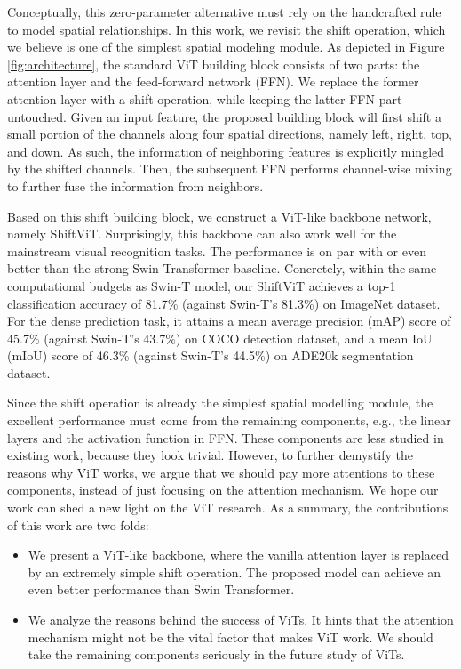 \documentclass[letterpaper]{article} \usepackage{aaai22}  \usepackage{times}  \usepackage{helvet}  \usepackage{courier}  \usepackage[hyphens]{url}  \usepackage{graphicx} \usepackage{amsmath}
\begin{document}
Conceptually, this zero-parameter alternative must rely on the handcrafted rule to model spatial relationships. In this work, we revisit the shift operation, which we believe is one of the simplest spatial modeling module. As depicted in Figure \ref{fig:architecture}, the standard ViT building block consists of two parts: the attention layer and the feed-forward network (FFN). We replace the former attention layer with a shift operation, while keeping the latter FFN part untouched. Given an input feature, the proposed building block will first shift a small portion of the channels along four spatial directions, namely left, right, top, and down. As such, the information of neighboring features is explicitly mingled by the shifted channels. Then, the subsequent FFN performs channel-wise mixing to further fuse the information from neighbors.

Based on this shift building block, we construct a ViT-like backbone network, namely ShiftViT. Surprisingly, this backbone can also work well for the mainstream visual recognition tasks. The performance is on par with or even better than the strong Swin Transformer baseline. Concretely, within the same computational budgets as Swin-T model, our ShiftViT achieves a top-1 classification accuracy of 81.7\% (against Swin-T's 81.3\%) on ImageNet dataset. For the dense prediction task, it attains a mean average precision (mAP) score of 45.7\% (against Swin-T's 43.7\%) on COCO detection dataset, and a mean IoU (mIoU) score of 46.3\% (against Swin-T's 44.5\%) on ADE20k segmentation dataset.

Since the shift operation is already the simplest spatial modelling module, the excellent performance must come from the remaining components, e.g., the linear layers and the activation function in FFN. These components are less studied in existing work, because they look trivial. However, to further demystify the reasons why ViT works, we argue that we should pay more attentions to these components, instead of just focusing on the attention mechanism. We hope our work can shed a new light on the ViT research. As a summary, the contributions of this work are two folds:

\begin{itemize}
\item We present a ViT-like backbone, where the vanilla attention layer is replaced by an extremely simple shift operation. The proposed model can achieve an even better performance than Swin Transformer.
\item We analyze the reasons behind the success of ViTs. It hints that the attention mechanism might not be the vital factor that makes ViT work. We should take the remaining components seriously in the future study of ViTs.
\end{itemize}
\end{document}
